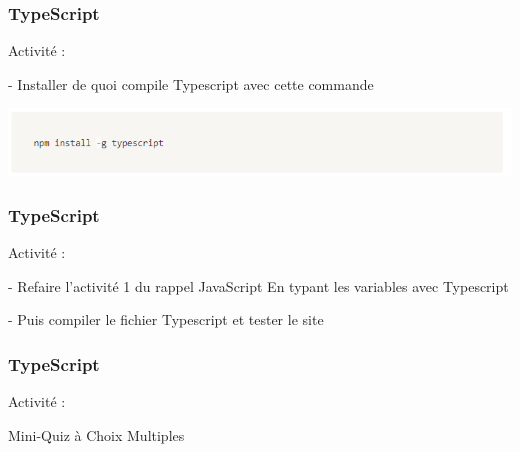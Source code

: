 \documentclass[10pt]{beamer}
\begin{document}
	\begin{frame}
		\frametitle{TypeScript}

		Activité : \newline \newline

		- Installer de quoi compile Typescript avec cette commande \newline \newline

		\includegraphics[width=16cm]{assets/tsInstall}\newline


	\end{frame}

	\begin{frame}
		\frametitle{TypeScript}

		Activité : \newline \newline

		- Refaire l'activité 1 du rappel JavaScript \newline
		En typant les variables avec Typescript \newline \newline

		- Puis compiler le fichier Typescript et tester le site \newline \newline



	\end{frame}

	\begin{frame}
		\frametitle{TypeScript}

		Activité : \newline \newline

		Mini-Quiz à Choix Multiples


	\end{frame}

\end{document}
